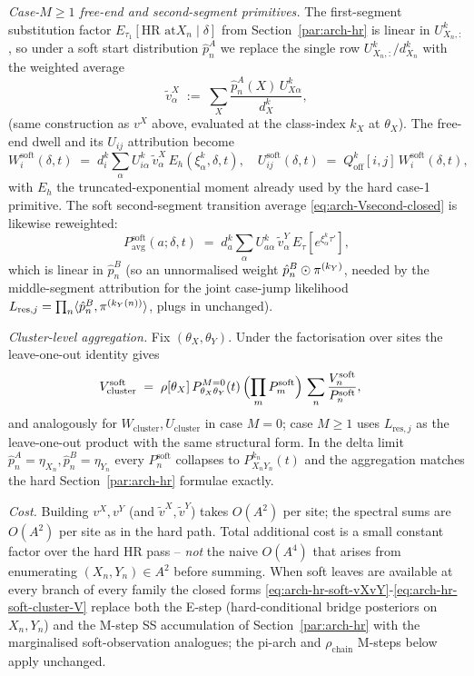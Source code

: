 \emph{Case-$M \ge 1$ free-end and second-segment primitives.} The
first-segment substitution factor $E_{\tau_1}[\text{HR at
$X_n$}\mid\delta]$ from Section~\ref{par:arch-hr} is linear in
$U^k_{X_n, :}$, so under a soft start distribution
$\hat p^{A}_n$ we replace the single row $U^k_{X_n, :}/d^k_{X_n}$ with the
weighted average
\[
  \tilde v^X_\alpha \;:=\;
    \sum_X \frac{\hat p^{A}_n(X)\, U^{k}_{X\alpha}}{d^k_X},
\]
(same construction as $v^X$ above, evaluated at the class-index
$k_X$ at $\theta_X$). The free-end dwell and its $U_{ij}$
attribution become
\begin{equation}
  W^{\mathrm{soft}}_i(\delta, t)
    \;=\; d^k_i \sum_\alpha U^k_{i\alpha}\,
       \tilde v^X_\alpha\, E_h(\xi^k_\alpha, \delta, t),
  \quad
  U^{\mathrm{soft}}_{ij}(\delta, t)
    \;=\; Q^k_{\text{off}}[i, j]\, W^{\mathrm{soft}}_i(\delta, t),
  \label{eq:arch-hr-soft-freend}
\end{equation}
with $E_h$ the truncated-exponential moment already used by the hard
case-1 primitive. The soft second-segment
transition average
\eqref{eq:arch-Vsecond-closed} is likewise reweighted:
\[
  P^{\mathrm{soft}}_{\mathrm{avg}}(a; \delta, t)
    \;=\; d^k_a \sum_\alpha U^k_{a\alpha}\,
      \tilde v^Y_\alpha\, E_\tau[e^{\xi^k_\alpha \tau'}],
\]
which is linear in $\hat p^{B}_n$ (so an unnormalised weight
$\hat p^{B}_n \odot \pi^{(k_Y)}$, needed by the middle-segment attribution
for the joint case-jump likelihood
$L_{\mathrm{res}, j} = \prod_n \langle \hat p^{B}_n, \pi^{(k_Y(n))}\rangle$,
plugs in unchanged).

\emph{Cluster-level aggregation.} Fix $(\theta_X, \theta_Y)$. Under the
factorisation over sites the leave-one-out identity gives
\begin{align}
  V^{\mathrm{soft}}_{\mathrm{cluster}}
    &\;=\; \rho[\theta_X]\, P^{M=0}_{\theta_X\theta_Y}(t)\,
      \Bigl(\prod_m P^{\mathrm{soft}}_m\Bigr)\,
      \sum_n \frac{V_n^{\mathrm{soft}}}{P^{\mathrm{soft}}_n},
  \label{eq:arch-hr-soft-cluster-V}
\end{align}
and analogously for $W_{\mathrm{cluster}}, U_{\mathrm{cluster}}$ in
case $M=0$; case $M \ge 1$ uses
$L_{\mathrm{res}, j}$ as the leave-one-out product with the same
structural form. In the delta limit $\hat p^{A}_n = \eta_{X_n},
\hat p^{B}_n = \eta_{Y_n}$ every $P^{\mathrm{soft}}_n$ collapses to
$P^{k_n}_{X_n Y_n}(t)$ and the aggregation matches the hard
Section~\ref{par:arch-hr} formulae exactly.

\emph{Cost.} Building $v^X, v^Y$ (and $\tilde v^X, \tilde v^Y$) takes
$O(A^2)$ per site; the spectral sums are $O(A^2)$ per site as in the
hard path. Total additional cost is a small constant factor over the
hard HR pass -- \emph{not} the naive $O(A^4)$ that arises from
enumerating $(X_n, Y_n) \in A^2$ before summing. When soft leaves are
available at every branch of every family the closed forms
\eqref{eq:arch-hr-soft-vXvY}-\eqref{eq:arch-hr-soft-cluster-V}
replace both the E-step (hard-conditional bridge posteriors on
$X_n, Y_n$) and the M-step SS accumulation of Section~\ref{par:arch-hr}
with the marginalised soft-observation analogues; the pi-arch and
$\rho_{\text{chain}}$ M-steps below apply unchanged.

